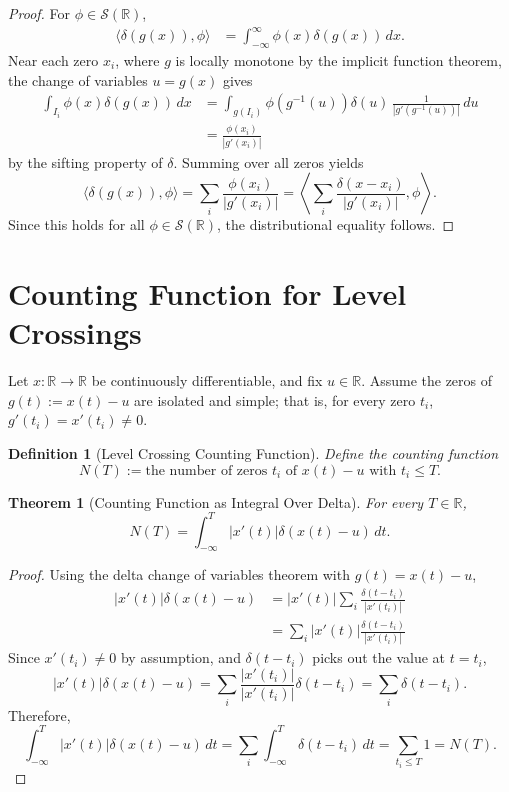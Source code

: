 \documentclass[11pt]{article}
\newtheorem{definition}{Definition}
\newtheorem{theorem}{Theorem}
\begin{document}
\begin{proof}
For $\phi \in \mathcal{S}(\mathbb{R})$,
\begin{align*}
\langle \delta(g(x)), \phi \rangle &= \int_{-\infty}^\infty \phi(x) \delta(g(x)) \, dx.
\end{align*}
Near each zero $x_i$, where $g$ is locally monotone by the implicit function theorem,
the change of variables $u = g(x)$ gives
\begin{align*}
\int_{I_i} \phi(x) \delta(g(x)) \, dx &= \int_{g(I_i)} \phi(g^{-1}(u)) \delta(u) \, \frac{1}{|g'(g^{-1}(u))|} \, du \\
&= \frac{\phi(x_i)}{|g'(x_i)|}
\end{align*}
by the sifting property of $\delta$. Summing over all zeros yields
\[
\langle \delta(g(x)), \phi \rangle = \sum_i \frac{\phi(x_i)}{|g'(x_i)|} = \left\langle \sum_i \frac{\delta(x - x_i)}{|g'(x_i)|}, \phi \right\rangle.
\]
Since this holds for all $\phi \in \mathcal{S}(\mathbb{R})$, the distributional equality follows.
\end{proof}

\section{Counting Function for Level Crossings}

Let $x: \mathbb{R} \to \mathbb{R}$ be continuously differentiable, and fix $u \in \mathbb{R}$.
Assume the zeros of $g(t) := x(t) - u$ are isolated and simple; that is,
for every zero $t_i$, $g'(t_i) = x'(t_i) \neq 0$.

\begin{definition}[Level Crossing Counting Function]
Define the counting function
\[
N(T) := \text{the number of zeros } t_i \text{ of } x(t) - u \text{ with } t_i \leq T.
\]
\end{definition}

\begin{theorem}[Counting Function as Integral Over Delta]
For every $T \in \mathbb{R}$,
\[
N(T) = \int_{-\infty}^T |x'(t)| \delta(x(t) - u) \, dt.
\]
\end{theorem}

\begin{proof}
Using the delta change of variables theorem with $g(t) = x(t) - u$,
\begin{align}
|x'(t)| \delta(x(t) - u) &= |x'(t)| \sum_i \frac{\delta(t - t_i)}{|x'(t_i)|} \\
&= \sum_i |x'(t)| \frac{\delta(t - t_i)}{|x'(t_i)|}
\end{align}
Since $x'(t_i) \neq 0$ by assumption, and $\delta(t - t_i)$ picks out the value at $t = t_i$,
\[
|x'(t)| \delta(x(t) - u) = \sum_i \frac{|x'(t_i)|}{|x'(t_i)|} \delta(t - t_i) = \sum_i \delta(t - t_i).
\]
Therefore,
\[
\int_{-\infty}^T |x'(t)| \delta(x(t) - u) \, dt = \sum_i \int_{-\infty}^T \delta(t - t_i) \, dt = \sum_{t_i \leq T} 1 = N(T).
\]
\end{proof}
\end{document}
